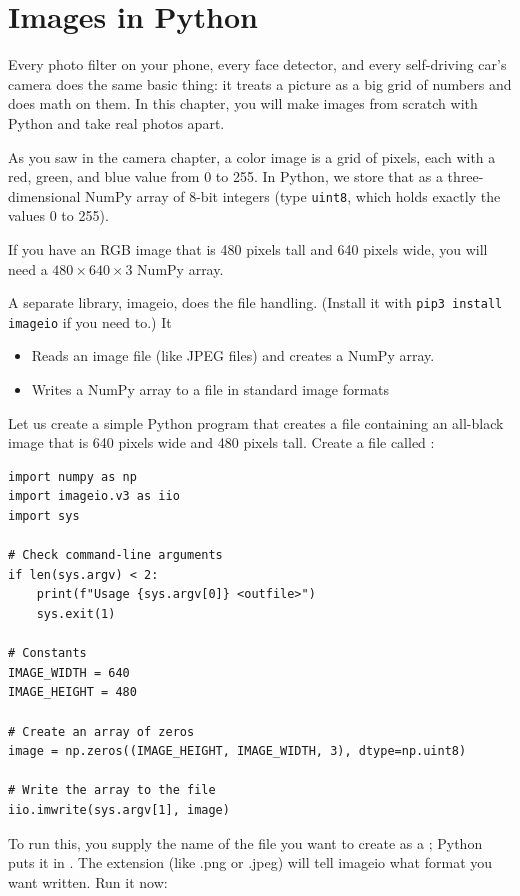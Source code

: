 \chapter{Images in Python}

Every photo filter on your phone, every face detector, and every
self-driving car's camera does the same basic thing: it treats a picture as
a big grid of numbers and does math on them. In this chapter, you will
make images from scratch with Python and take real photos apart.

As you saw in the camera chapter, a color image is a grid of pixels, each
with a red, green, and blue value from 0 to 255. In Python, we store that
as a three-dimensional NumPy array of 8-bit integers
(type \texttt{uint8}, which holds exactly the values 0 to 255).

If you have an RGB image that is 480 pixels tall and 640 pixels wide,
you will need a $480 \times 640 \times 3$ NumPy array.

A separate library, imageio, does the file handling. (Install it with
\texttt{pip3 install imageio} if you need to.) It
\begin{itemize}
\item Reads an image file (like JPEG files) and creates a NumPy array.
\item Writes a NumPy array to a file in standard image formats
\end{itemize}

Let us create a simple Python program that creates a file containing an
all-black image that is 640 pixels wide and 480 pixels tall. Create a
file called :

\begin{verbatim}
import numpy as np
import imageio.v3 as iio
import sys

# Check command-line arguments
if len(sys.argv) < 2:
    print(f"Usage {sys.argv[0]} <outfile>")
    sys.exit(1)

# Constants
IMAGE_WIDTH = 640
IMAGE_HEIGHT = 480

# Create an array of zeros
image = np.zeros((IMAGE_HEIGHT, IMAGE_WIDTH, 3), dtype=np.uint8)

# Write the array to the file
iio.imwrite(sys.argv[1], image)
\end{verbatim}

To run this, you supply the name of the file you want to create as a
; Python puts it
in . The extension (like .png or .jpeg) will tell imageio
what format you want written. Run it now:

